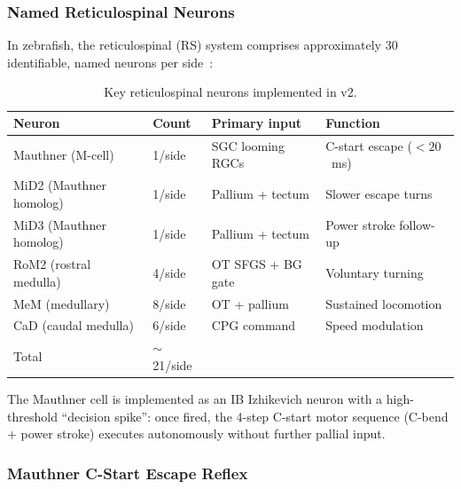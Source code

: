 \documentclass[11pt,a4paper]{article}
\begin{document}
\subsubsection{Named Reticulospinal Neurons}

In zebrafish, the reticulospinal (RS) system comprises approximately
30 identifiable, named neurons per side~\cite{orger2008}:

\begin{table}[H]
\centering
\caption{Key reticulospinal neurons implemented in v2.}
\label{tab:rs_neurons}
\begin{tabular}{llll}
\toprule
Neuron & Count & Primary input & Function \\
\midrule
Mauthner (M-cell)       & 1/side & SGC looming RGCs  & C-start escape ($< 20$~ms) \\
MiD2 (Mauthner homolog) & 1/side & Pallium + tectum  & Slower escape turns \\
MiD3 (Mauthner homolog) & 1/side & Pallium + tectum  & Power stroke follow-up \\
RoM2 (rostral medulla)  & 4/side & OT SFGS + BG gate & Voluntary turning \\
MeM (medullary)         & 8/side & OT + pallium      & Sustained locomotion \\
CaD (caudal medulla)    & 6/side & CPG command       & Speed modulation \\
\midrule
Total & $\sim$21/side & & \\
\bottomrule
\end{tabular}
\end{table}

The Mauthner cell is implemented as an IB Izhikevich neuron with a
high-threshold ``decision spike'': once fired, the 4-step C-start
motor sequence (C-bend + power stroke) executes autonomously
without further pallial input.

\subsubsection{Mauthner C-Start Escape Reflex}
\end{document}

